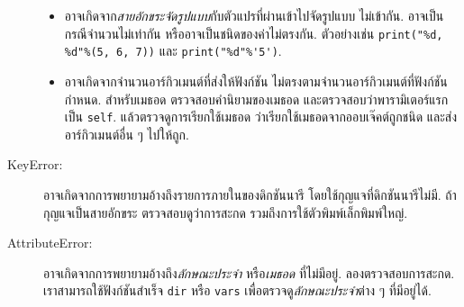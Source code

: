 \begin{description}
\begin{itemize}
\item อาจเกิดจาก\textit{สายอักขระจัดรูปแบบ}กับตัวแปรที่ผ่านเข้าไปจัดรูปแบบ ไม่เข้ากัน.
อาจเป็นกรณีจำนวนไม่เท่ากัน
หรืออาจเป็นชนิดของค่าไม่ตรงกัน.
ตัวอย่างเช่น
\verb|print("%d, %d"%(5, 6, 7))|
และ
 \verb|print("%d"%'5')|.


\item อาจเกิดจากจำนวนอาร์กิวเมนต์ที่ส่งให้ฟังก์ชัน ไม่ตรงตามจำนวนอาร์กิวเมนต์ที่ฟังก์ชันกำหนด.
สำหรับเมธอด 
ตรวจสอบคำนิยามของเมธอด
และตรวจสอบว่าพารามิเตอร์แรก
เป็น \texttt{self}.
แล้วตรวจดูการเรียกใช้เมธอด
ว่าเรียกใช้เมธอดจากออบเจ๊คต์ถูกชนิด
และส่งอาร์กิวเมนต์อื่น ๆ ไปให้ถูก.

\end{itemize}

\item[KeyError:]  
%
อาจเกิดจากการพยายามอ้างถึงรายการภายในของดิกชันนารี โดยใช้กุญแจที่ดิกชันนารีไม่มี.
ถ้ากุญแจเป็นสายอักขระ
ตรวจสอบดูว่าการสะกด
รวมถึงการใช้ตัวพิมพ์เล็กพิมพ์ใหญ่.

\item[AttributeError:] 
%
อาจเกิดจากการพยายามอ้างถึง\textit{ลักษณะประจำ} หรือ\textit{เมธอด} ที่ไม่มีอยู่.
ลองตรวจสอบการสะกด.
เราสามารถใช้ฟังก์ชันสำเร็จ \texttt{dir} หรือ \texttt{vars} เพื่อตรวจดู\textit{ลักษณะประจำ}ต่าง ๆ ที่มีอยู่ได้.


%


\end{description}
